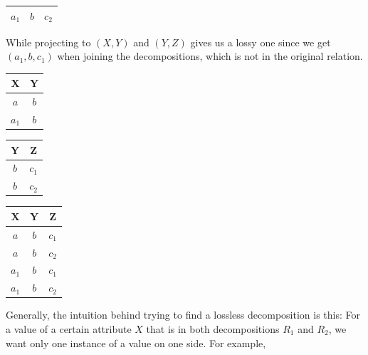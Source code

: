 \documentclass{article}
\begin{document}
\begin{example}
\begin{table}[H]
\begin{minipage}{.32\textwidth}
\begin{tabular}{|c|c|c|}
            $a_1$ & $b$ & $c_2$ \\
            \hline
          \end{tabular}
          \label{tab:ex71}
        \end{minipage}
      \end{table}
      While projecting to $(X, Y)$ and $(Y, Z)$ gives us a lossy one since we get $(a_1, b, c_1)$ when joining the decompositions, which is not in the original relation. 
      \begin{table}[H]
        \centering
        \begin{minipage}{.32\textwidth}
          \centering
          \begin{tabular}{|c|c|}
            \hline
            \textbf{X} & \textbf{Y} \\
            \hline
            $a$ & $b$ \\
            $a_1$ & $b$ \\
            \hline
          \end{tabular}
          \label{tab:ex8}
        \end{minipage}
        \begin{minipage}{.32\textwidth}
          \centering
          \begin{tabular}{|c|c|}
            \hline
            \textbf{Y} & \textbf{Z} \\
            \hline
            $b$ & $c_1$ \\
            $b$ & $c_2$ \\
            \hline
          \end{tabular}
          \label{tab:ex9}
        \end{minipage}
        \begin{minipage}{.32\textwidth}
          \centering
          \begin{tabular}{|c|c|c|}
            \hline
            \textbf{X} & \textbf{Y} & \textbf{Z}\\
            \hline
            $a$ & $b$ & $c_1$ \\
            $a$ & $b$ & $c_2$ \\
            $a_1$ & $b$ & $c_1$ \\
            $a_1$ & $b$ & $c_2$ \\
            \hline
          \end{tabular}
          \label{tab:ex10}
        \end{minipage}
      \end{table}
      Generally, the intuition behind trying to find a lossless decomposition is this: For a value of a certain attribute $X$ that is in both decompositions $R_1$ and $R_2$, we want only one instance of a value on one side. For example, 

\end{example}
\end{document}
